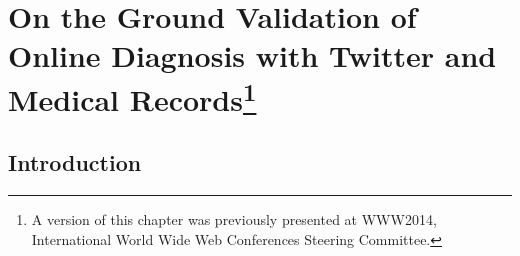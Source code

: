 

\chapter[On the Ground Validation of Online Diagnosis with Twitter and Medical Records]{On the Ground Validation of Online Diagnosis with Twitter and Medical Records\footnote{A version of this chapter \cite{Bodnar:2014:GVO:2567948.2579272} was previously presented at WWW2014,  International World Wide Web Conferences Steering Committee. }}
\label{www2014}


\section{Introduction}

